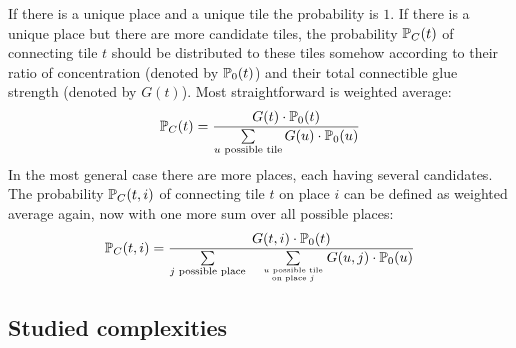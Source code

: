 	\begin{note}\label{note:tilesystems}
		If there is a unique place and a unique tile the probability is $1$. If there is a unique place but there are more candidate tiles, the probability $\mathbb{P}_C(t)$ of connecting tile $t$ should be distributed to these tiles somehow according to their ratio of concentration (denoted by $\mathbb{P}_0(t)$) and their total connectible glue strength (denoted by $G(t)$). Most straightforward is weighted average:
		\begin{equation*}
			\mathbb{P}_C(t) = \frac{G(t)\cdot\mathbb{P}_0(t)}{\sum\limits_{u\textnormal{ possible tile}}G(u)\cdot\mathbb{P}_0(u)}
		\end{equation*}
		In the most general case there are more places, each having several candidates. The probability $\mathbb{P}_C(t,i)$ of connecting tile $t$ on place $i$ can be defined as weighted average again, now with one more sum over all possible places:
		\begin{equation*}
			\mathbb{P}_C(t,i) = \frac{G(t,i)\cdot\mathbb{P}_0(t)}{\sum\limits_{j\textnormal{ possible place}}\quad\sum\limits_{u\textnormal{ possible tile}\atop\textnormal{on place }j}G(u,j)\cdot\mathbb{P}_0(u)}
		\end{equation*}
	\end{note}


\subsection{Studied complexities}
	
